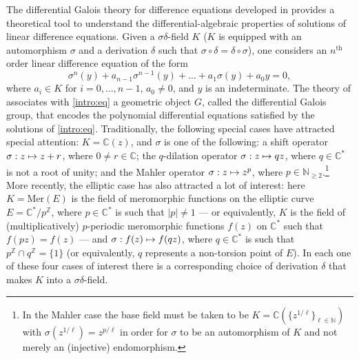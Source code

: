 \documentclass[10pt]{amsart}
\newcommand\mto{\mathchoice{\longmapsto}{\mapsto}{\mapsto}{\mapsto}}
\theoremstyle{definition}
\begin{document}
The differential Galois theory for difference equations developed in \cite{HS} provides a theoretical tool to understand the differential-algebraic properties of solutions of linear difference equations. Given a $\sigma\delta$-field $K$ (\ie $K$ is equipped with an automorphism $\sigma$ and a derivation $\delta$ such that $\sigma\circ\delta=\delta\circ\sigma$), one considers an $n^\text{th}$ order linear difference equation of the form\vspace*{-3pt}
\begin{equation}\label{intro:eq} \sigma^n(y)+a_{n-1}\sigma^{n-1}(y)+\dots+a_1\sigma(y)+a_0y=0,\end{equation}
where $a_i\in K$ for $i=0,\dots,n-1$, $a_0\neq 0$, and $y$ is an indeterminate. The theory of \cite{HS} associates with \eqref{intro:eq} a geometric object $G$, called the differential Galois group, that encodes the polynomial differential equations satisfied by the solutions of \eqref{intro:eq}. Traditionally, the following special cases have attracted special attention: $K=\mathbb{C}(z)$, and $\sigma$ is one of the following: a shift operator $\sigma:z\mto z+r$, where $0\neq r\in\mathbb{C}$; the $q$-dilation operator $\sigma: z\mto qz$, where $q\in\mathbb{C}^*$ is not a root of unity; and the Mahler operator $\sigma : z\mto z^p$, where $p\in\mathbb{N}_{\geq 2}$.\footnote{In the Mahler case the base field must be taken to be $K=\mathbb{C}(\{z^{1/\ell}\}_{\ell\in\mathbb{N}})$ with $\sigma(z^{1/\ell})=z^{p/\ell}$ in order for $\sigma$ to be an automorphism of $K$ and not merely an (injective) endomorphism.} More recently, the elliptic case has also attracted a lot of interest: here $K=\mathrm{Mer}(E)$ is the field of meromorphic functions on the elliptic curve $E=\mathbb{C}^*/p^\mathbb{Z}$, where $p\in\mathbb{C}^*$ is such that $|p|\neq 1$ --- or equivalently, $K$ is the field of (multiplicatively) $p$-periodic meromorphic functions $f(z)$ on $\mathbb{C}^*$ such that $f(pz)=f(z)$ --- and $\sigma:f(z)\mto f(qz)$, where $q\in\mathbb{C}^*$ is such that $p^\mathbb{Z}\cap q^\mathbb{Z}=\{1\}$ (or equivalently, $q$ represents a non-torsion point of $E$). In each one of these four cases of interest there is a corresponding choice of derivation $\delta$ that makes $K$ into a $\sigma\delta$-field.
\end{document}

